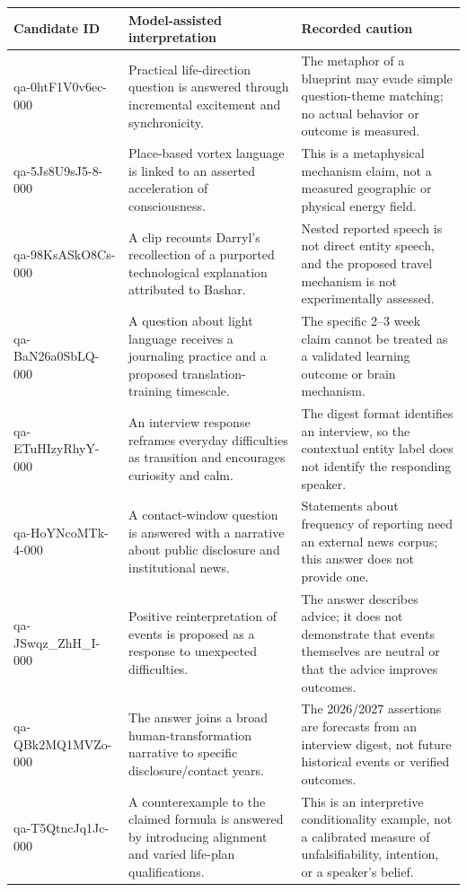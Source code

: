 \begingroup\footnotesize
\setlength{\tabcolsep}{3pt}
\begin{longtable}{p{}p{}p{}}
\toprule Candidate ID & Model-assisted interpretation & Recorded caution \\ \midrule\endhead
qa-0htF1V0v6ec-000 & Practical life-direction question is answered through incremental excitement and synchronicity. & The metaphor of a blueprint may evade simple question-theme matching; no actual behavior or outcome is measured. \\
qa-5Js8U9sJ5-8-000 & Place-based vortex language is linked to an asserted acceleration of consciousness. & This is a metaphysical mechanism claim, not a measured geographic or physical energy field. \\
qa-98KsASkO8Cs-000 & A clip recounts Darryl's recollection of a purported technological explanation attributed to Bashar. & Nested reported speech is not direct entity speech, and the proposed travel mechanism is not experimentally assessed. \\
qa-BaN26a0SbLQ-000 & A question about light language receives a journaling practice and a proposed translation-training timescale. & The specific 2--3 week claim cannot be treated as a validated learning outcome or brain mechanism. \\
qa-ETuHIzyRhyY-000 & An interview response reframes everyday difficulties as transition and encourages curiosity and calm. & The digest format identifies an interview, so the contextual entity label does not identify the responding speaker. \\
qa-HoYNcoMTk-4-000 & A contact-window question is answered with a narrative about public disclosure and institutional news. & Statements about frequency of reporting need an external news corpus; this answer does not provide one. \\
qa-JSwqz\_ZhH\_I-000 & Positive reinterpretation of events is proposed as a response to unexpected difficulties. & The answer describes advice; it does not demonstrate that events themselves are neutral or that the advice improves outcomes. \\
qa-QBk2MQ1MVZo-000 & The answer joins a broad human-transformation narrative to specific disclosure/contact years. & The 2026/2027 assertions are forecasts from an interview digest, not future historical events or verified outcomes. \\
qa-T5QtncJq1Jc-000 & A counterexample to the claimed formula is answered by introducing alignment and varied life-plan qualifications. & This is an interpretive conditionality example, not a calibrated measure of unfalsifiability, intention, or a speaker's belief. \\

\end{longtable}
